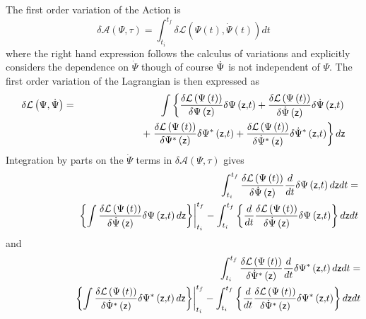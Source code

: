 \documentclass[aps,preprint]{revtex4}
\begin{document}
The first order variation of the Action is 
\begin{equation}
\delta \mathcal{A}\left( \Psi ,\tau \right) =\int_{t_{i}}^{t_{f}}\delta 
\mathcal{L}\left( \Psi \left( t\right) ,\dot{\Psi}\left( t\right) \right) dt
\end{equation}%
where the right hand expression follows the calculus of variations and
explicitly considers the dependence on $\dot{\Psi}$ though of course $\dot{%
\Psi}$ is not independent of $\Psi $. The first order variation of the
Lagrangian is then expressed as 
\begin{eqnarray}
\delta \mathcal{L}\left( \Psi ,\dot{\Psi}\right) &=&\int \left\{ \frac{%
\delta \mathcal{L}\left( \Psi \left( t\right) \right) }{\delta \Psi \left( 
\mathsf{z}\right) }\delta \Psi \left( \mathsf{z,}t\right) +\frac{\delta 
\mathcal{L}\left( \Psi \left( t\right) \right) }{\delta \dot{\Psi}\left( 
\mathsf{z}\right) }\delta \dot{\Psi}\left( \mathsf{z,}t\right) \right. 
\notag \\
&&\qquad \qquad \qquad +\left. \frac{\delta \mathcal{L}\left( \Psi \left(
t\right) \right) }{\delta \Psi ^{\ast }\left( \mathsf{z}\right) }\delta \Psi
^{\ast }\left( \mathsf{z,}t\right) +\frac{\delta \mathcal{L}\left( \Psi
\left( t\right) \right) }{\delta \dot{\Psi}^{\ast }\left( \mathsf{z}\right) }%
\delta \dot{\Psi}^{\ast }\left( \mathsf{z,}t\right) \right\} d\mathsf{z}
\end{eqnarray}%
Integration by parts on the $\dot{\Psi}$ terms in $\delta \mathcal{A}\left(
\Psi ,\tau \right) $ gives 
\begin{eqnarray}
&&\int_{t_{i}}^{t_{f}}\frac{\delta \mathcal{L}\left( \Psi \left( t\right)
\right) }{\delta \dot{\Psi}\left( \mathsf{z}\right) }\frac{d}{dt}\delta \Psi
\left( \mathsf{z,}t\right) d\mathsf{z}dt=  \notag \\
&&\qquad \qquad \qquad \left. \left\{ \int \frac{\delta \mathcal{L}\left(
\Psi \left( t\right) \right) }{\delta \dot{\Psi}\left( \mathsf{z}\right) }%
\delta \Psi \left( \mathsf{z,}t\right) d\mathsf{z}\right\} \right\vert
_{t_{i}}^{t_{f}}-\int_{t_{i}}^{t_{f}}\left\{ \frac{d}{dt}\frac{\delta 
\mathcal{L}\left( \Psi \left( t\right) \right) }{\delta \dot{\Psi}\left( 
\mathsf{z}\right) }\delta \Psi \left( \mathsf{z,}t\right) \right\} d\mathsf{z%
}dt
\end{eqnarray}%
and 
\begin{eqnarray}
&&\int_{t_{i}}^{t_{f}}\frac{\delta \mathcal{L}\left( \Psi \left( t\right)
\right) }{\delta \dot{\Psi}^{\ast }\left( \mathsf{z}\right) }\frac{d}{dt}%
\delta \Psi ^{\ast }\left( \mathsf{z,}t\right) d\mathsf{z}dt=  \notag \\
&&\qquad \qquad \qquad \left. \left\{ \int \frac{\delta \mathcal{L}\left(
\Psi \left( t\right) \right) }{\delta \dot{\Psi}^{\ast }\left( \mathsf{z}%
\right) }\delta \Psi ^{\ast }\left( \mathsf{z,}t\right) d\mathsf{z}\right\}
\right\vert _{t_{i}}^{t_{f}}-\int_{t_{i}}^{t_{f}}\left\{ \frac{d}{dt}\frac{%
\delta \mathcal{L}\left( \Psi \left( t\right) \right) }{\delta \dot{\Psi}%
^{\ast }\left( \mathsf{z}\right) }\delta \Psi ^{\ast }\left( \mathsf{z,}%
t\right) \right\} d\mathsf{z}dt
\end{eqnarray}%
\end{document}
